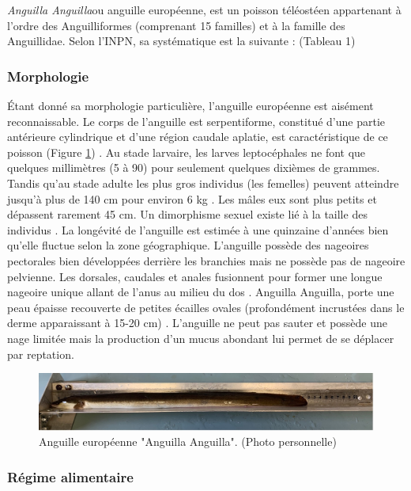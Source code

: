 \documentclass[11pt,titlepage,twoside]{article}\usepackage[]{graphicx}\usepackage[table]{xcolor}
\begin{document}
\textit{Anguilla Anguilla}ou anguille européenne, est un poisson téléostéen appartenant à l'ordre des Anguilliformes (comprenant 15 familles) et à la famille des Anguillidae.
Selon l’INPN, sa systématique est la suivante : (Tableau 1)

\subsubsection{Morphologie }

Étant donné sa morphologie particulière, l’anguille européenne est aisément reconnaissable. Le corps de l’anguille est serpentiforme, constitué d’une partie antérieure cylindrique et d’une région caudale aplatie, est caractéristique de ce poisson (Figure \ref{Morpho}) \citep{dekker_worldwide_2003}. Au stade larvaire, les larves leptocéphales ne font que quelques millimètres (5 à 90) pour seulement quelques dixièmes de grammes. Tandis qu’au stade adulte les plus gros individus (les femelles) peuvent atteindre jusqu’à plus de 140 cm pour environ 6 kg \citep{tutman_new_2007}. Les mâles eux sont plus petits et dépassent rarement 45 cm. Un dimorphisme sexuel existe lié à la taille des individus \citep{brusle_biologie_2001}. La longévité de l’anguille est estimée à une quinzaine d’années bien qu’elle fluctue selon la zone géographique. L’anguille possède des nageoires pectorales bien développées derrière les branchies mais ne possède pas de nageoire pelvienne. Les dorsales, caudales et anales fusionnent pour former une longue nageoire unique allant de l’anus au milieu du dos \citep{hirschinger_donnees_2015}. Anguilla Anguilla, porte une peau épaisse recouverte de petites écailles ovales (profondément incrustées dans le derme apparaissant à 15-20 cm) \citep{feunteun_commercially_2011}.  L’anguille ne peut pas sauter et possède une nage limitée mais la production d’un mucus abondant lui permet de se déplacer par reptation.

\begin{figure}[htpb]
\centering
\includegraphics[width=\textwidth]{Morpho.jpg}
\caption{Anguille européenne "Anguilla Anguilla". (Photo personnelle)}
\label{Morpho}
\end{figure}

\subsubsection{Régime alimentaire}
\end{document}
